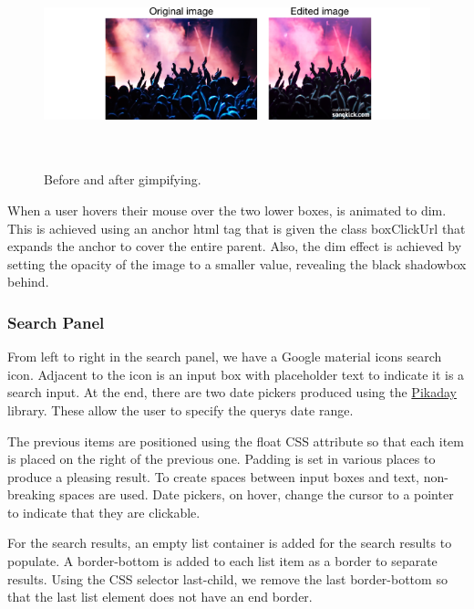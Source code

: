 \documentclass[10pt]{article}
\begin{document}
                \begin{figure}[!ht]
                  \centering
                      \includegraphics[height=60mm]{example2.png}
                  \caption{Before and after gimpifying.}
                \end{figure}


                When a user hovers their mouse over the two lower boxes, is animated to dim. This is achieved using an anchor html tag that is given the class boxClickUrl that expands the anchor to cover the entire parent. Also, the dim effect is achieved by setting the opacity of the image to a smaller value, revealing the black shadowbox behind.

            \subsubsection{Search Panel}
                From left to right in the search panel, we have a Google material icons search icon. Adjacent to the icon is an input box with placeholder text to indicate it is a search input. At the end, there are two date pickers produced using the \href{https://github.com/dbushell/Pikaday}{Pikaday} library. These allow the user to specify the query\textquotesingle s date range.

                The previous items are positioned using the float CSS attribute so that each item is placed on the right of the previous one. Padding is set in various places to produce a pleasing result.  To create spaces between input boxes and text, non-breaking spaces are used. Date pickers, on hover, change the cursor to a pointer to indicate that they are clickable.

                For the search results, an empty list container is added for the search results to populate. A border-bottom is added to each list item as a border to separate results. Using the CSS selector last-child, we remove the last border-bottom so that the last list element does not have an end border.
\end{document}
